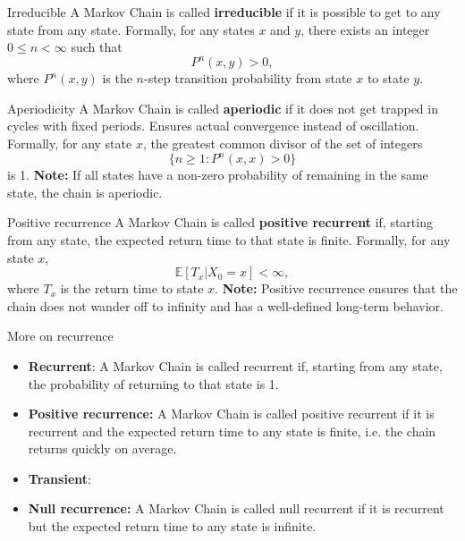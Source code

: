 \begin{frame}{Irreducible}
    A Markov Chain is called \textbf{irreducible} if it is possible to get to any state 
    from any state. Formally, for any states $x$ and $y$, there exists an integer
    $0 \leq n < \infty$ such that
    \begin{equation*}
        P^n(x, y) > 0,
    \end{equation*}
    where $P^n(x, y)$ is the $n$-step transition probability from state $x$ to state $y$.
\end{frame}

\begin{frame}{Aperiodicity}
    A Markov Chain is called \textbf{aperiodic} if it does not get trapped in cycles with fixed periods. Ensures actual convergence instead of oscillation.
    Formally, for any state $x$, the greatest common divisor of the set of integers
    \begin{equation*}
        \{ n \geq 1 : P^n(x, x) > 0 \}
    \end{equation*}
    is 1.
    \textbf{Note:} If all states have a non-zero probability of remaining in the same state, the chain is aperiodic.
\end{frame}

\begin{frame}{Positive recurrence}
    A Markov Chain is called \textbf{positive recurrent} if, starting from any state, the expected return time to that state is finite. Formally, for any state $x$,
    \begin{equation*}
        \mathbb{E}[T_x | X_0 = x] < \infty,
    \end{equation*}
    where $T_x$ is the return time to state $x$.
    \textbf{Note:} Positive recurrence ensures that the chain does not wander off to infinity and has a well-defined long-term behavior.
\end{frame}

\begin{frame}{More on recurrence}
    \begin{itemize}
        \item \textbf{Recurrent}: A Markov Chain is called recurrent if, starting from any state, the probability of returning to that state is 1.
        \item \textbf{Positive recurrence:} A Markov Chain is called positive recurrent if it is recurrent and the expected return time to any state is finite, i.e. the chain returns quickly on average.
        \item \textbf{Transient}:
        \item \textbf{Null recurrence:} A Markov Chain is called null recurrent if it is recurrent but the expected return time to any state is infinite.
    \end{itemize}
\end{frame}

% 